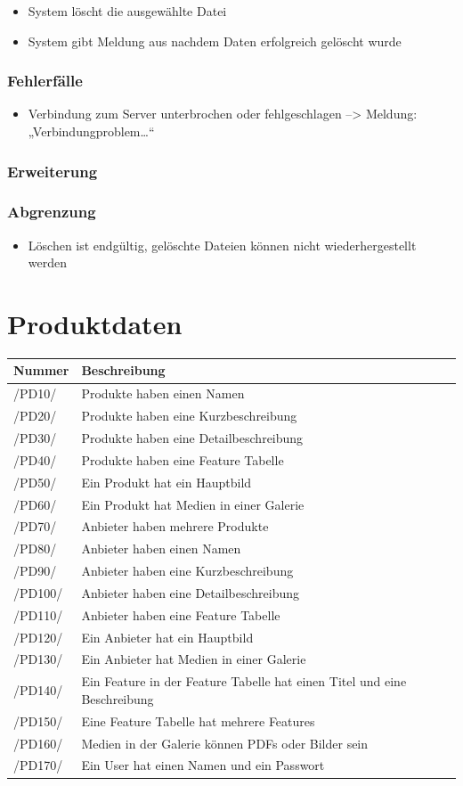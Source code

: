 \documentclass[a4paper,12pt]{article}
\newcommand\addrow[2]{#1 &#2\\ }
\newcommand\addheading[2]{#1 &#2\\ \hline}
\newcommand\tabularhead{\begin{tabular}{lp{13cm}}
\hline
}
\newenvironment{usecase}{\tabularhead}
{\hline\end{tabular}}
\begin{document}
\begin{itemize}

\item
  System löscht die ausgewählte Datei
\item
  System gibt Meldung aus nachdem Daten erfolgreich gelöscht wurde
\end{itemize}

\subsubsection{Fehlerfälle}\label{fehlerfalle-13}

\begin{itemize}

\item
  Verbindung zum Server unterbrochen oder fehlgeschlagen
  --\textgreater{} Meldung: „Verbindungproblem\ldots{}``
\end{itemize}

\subsubsection{Erweiterung}\label{erweiterung-13}

\subsubsection{Abgrenzung}\label{abgrenzung-13}

\begin{itemize}

\item
  Löschen ist endgültig, gelöschte Dateien können nicht
  wiederhergestellt werden
\end{itemize}


\section{Produktdaten}
\begin{usecase}
  \addheading{Nummer}{Beschreibung} 
  \addrow{/PD10/}{Produkte haben einen Namen}
  \addrow{/PD20/}{Produkte haben eine Kurzbeschreibung}
  \addrow{/PD30/}{Produkte haben eine Detailbeschreibung}
  \addrow{/PD40/}{Produkte haben eine Feature Tabelle}
  \addrow{/PD50/}{Ein Produkt hat ein Hauptbild}
  \addrow{/PD60/}{Ein Produkt hat Medien in einer Galerie} 
  \addrow{/PD70/}{Anbieter haben mehrere Produkte}
  \addrow{/PD80/}{Anbieter haben einen Namen}
  \addrow{/PD90/}{Anbieter haben eine Kurzbeschreibung}
  \addrow{/PD100/}{Anbieter haben eine Detailbeschreibung}
  \addrow{/PD110/}{Anbieter haben eine Feature Tabelle}
  \addrow{/PD120/}{Ein Anbieter hat ein Hauptbild}
  \addrow{/PD130/}{Ein Anbieter hat Medien in einer Galerie} 
  \addrow{/PD140/}{Ein Feature in der Feature Tabelle hat einen Titel und eine Beschreibung}
  \addrow{/PD150/}{Eine Feature Tabelle hat mehrere Features}
  \addrow{/PD160/}{Medien in der Galerie können PDFs oder Bilder sein}
  \addrow{/PD170/}{Ein User hat einen Namen und ein Passwort}
\end{usecase}
\end{document}

